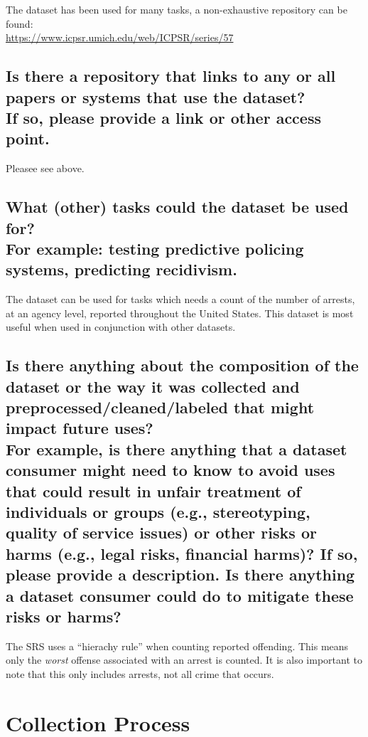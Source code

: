 \documentclass[letterpaper, 10 pt, conference]{ieeeconf}  %
\newcommand{\subtitle}[1]{{\\ \small \normalfont \color{purple} #1}}
\begin{document}
The dataset has been used for many tasks, a non-exhaustive repository can be found: \\

\href{https://www.icpsr.umich.edu/web/ICPSR/series/57}{https://www.icpsr.umich.edu/web/ICPSR/series/57}

\subsection{Is there a repository that links to any or all papers or systems that use the dataset? \subtitle{If so, please provide a link or other access point. }}

Pleasee see above. 

\subsection{What (other) tasks could the dataset be used for? \subtitle{For example: testing predictive policing systems, predicting recidivism.}}

The dataset can be used for tasks which needs a count of the number of arrests, at an agency level, reported throughout the United States. This dataset is most useful when used in conjunction with other datasets.

\subsection{Is there anything about the composition of the dataset or the way it was collected and preprocessed/cleaned/labeled that might impact future uses? \subtitle{For example, is there anything that a dataset consumer might need to know to avoid uses that could result in unfair treatment of individuals or groups (e.g., stereotyping, quality of service issues) or other risks or harms (e.g., legal risks, financial harms)? If so, please provide a description. Is there anything a dataset consumer could do to mitigate these risks or harms?}}

The SRS uses a ``hierachy rule'' when counting reported offending. This means only the \textit{worst} offense associated with an arrest is counted. It is also important to note that this only includes arrests, not all crime that occurs.


\section{Collection Process}
\end{document}
